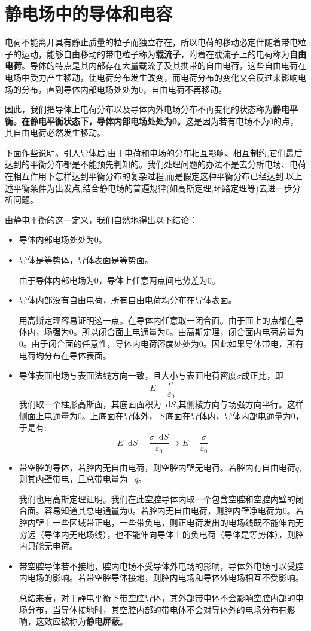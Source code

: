 \documentclass[12pt,a4paper,oneside]{report}
\theoremstyle{definition}
\theoremstyle{remark}
\renewcommand{\d}{\mathop{}\!\mathrm{d}}
\begin{document}
\section{静电场中的导体和电容}
电荷不能离开具有静止质量的粒子而独立存在，所以电荷的移动必定伴随着带电粒子的运动，能够自由移动的带电粒子称为\textbf{载流子}，附着在载流子上的电荷称为\textbf{自由电荷}。导体的特点是其内部存在大量载流子及其携带的自由电荷，这些自由电荷在电场中受力产生移动，使电荷分布发生改变，而电荷分布的变化又会反过来影响电场的分布，直到导体内部电场处处为0，自由电荷不再移动。

因此，我们把导体上电荷分布以及导体内外电场分布不再变化的状态称为\textbf{静电平衡。在静电平衡状态下，导体内部电场处处为0。}这是因为若有电场不为0的点，其自由电荷必然发生移动。

下面作些说明。引人导体后,由于电荷和电场的分布相互影响、相互制约,它们最后达到的平衡分布都是不能预先判知的。我们处理问题的办法不是去分析电场、电荷在相互作用下怎样达到平衡分布的复杂过程,而是假定这种平衡分布已经达到,以上述平衡条件为出发点,结合静电场的普遍规律(如高斯定理,环路定理等)去进一步分析问题。

由静电平衡的这一定义，我们自然地得出以下结论：
\begin{itemize}
  \item 导体内部电场处处为0。
  \item 导体是等势体，导体表面是等势面。
  
  由于导体内部电场为0，导体上任意两点间电势差为0。
  \item 导体内部没有自由电荷，所有自由电荷均分布在导体表面。
  
  用高斯定理容易证明这一点。在导体内任意取一闭合面。由于面上的点都在导体内，场强为0。所以闭合面上电通量为0。由高斯定理，闭合面内电荷总量为0。由于闭合面的任意性，导体内电荷密度处处为0。因此如果导体带电，所有电荷均分布在导体表面。

  \item 导体表面电场与表面法线方向一致，且大小与表面电荷密度$\sigma$成正比，即
  \[
  E = \frac{\sigma}{\varepsilon_0}
  \]
  我们取一个柱形高斯面，其底面面积为$\d S$,其侧棱方向与场强方向平行。这样侧面上电通量为0。上底面在导体外，下底面在导体内，导体内部电通量为0，于是有:
  \[
  E \d S = \frac{\sigma \d S}{\varepsilon_0}
  \Rightarrow E = \frac{\sigma}{\varepsilon_0}
  \]

  \item 带空腔的导体，若腔内无自由电荷，则空腔内壁无电荷。若腔内有自由电荷$q$,则其内壁带电，且总带电量为$-q$。
  
  我们也用高斯定理证明。我们在此空腔导体内取一个包含空腔和空腔内壁的闭合面。容易知道其总电通量为0。若腔内无自由电荷，则腔内壁净电荷为0。若腔内壁上一些区域带正电，一些带负电，则正电荷发出的电场线既不能伸向无穷远（导体内无电场线），也不能伸向导体上的负电荷（导体是等势体），则腔内只能无电荷。

  \item 带空腔导体若不接地，腔内电场不受导体外电场的影响，导体外电场可以受腔内电场的影响。若带空腔导体接地，则腔内电场和导体外电场相互不受影响。
  
  总结来看，对于静电平衡下带空腔导体，其外部带电体不会影响空腔内部的电场分布，当导体接地时，其空腔内部的带电体不会对导体外的电场分布有影响，这效应被称为\textbf{静电屏蔽}。
\end{itemize}
\end{document}
